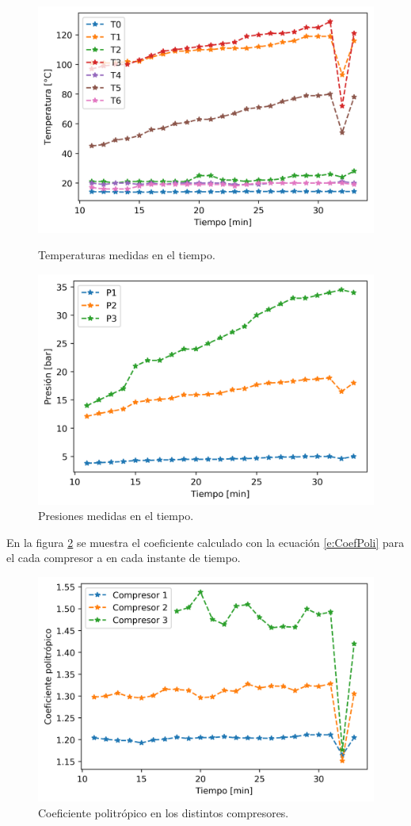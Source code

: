 \documentclass[11pt,letterpaper]{extarticle}        %
\numberwithin{equation}{section}                    %
\begin{document}
\begin{figure}[H]
\begin{minipage}{0.5\linewidth}
\centering
\includegraphics[width = \linewidth]{Temperatura}
\caption{Temperaturas medidas en el tiempo.}
\label{f:Temperatura}
\end{minipage}
\begin{minipage}{0.5\linewidth}
\centering
\includegraphics[width = \linewidth]{Presiones}
\caption{Presiones medidas en el tiempo.}
\label{f:Presion}
\end{minipage}
\end{figure}


En la figura \ref{f:Coeficiente} se muestra el coeficiente calculado con la ecuación \ref{e:CoefPoli} para el cada compresor a en cada instante de tiempo. 
\begin{figure}[H]
\centering
\includegraphics[width=0.6\linewidth]{Coef}
\caption{Coeficiente politrópico en los distintos compresores.}
\label{f:Coeficiente}
\end{figure}
\end{document}
